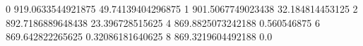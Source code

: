 0 919.0633544921875 49.74139404296875
1 901.5067749023438 32.184814453125
2 892.7186889648438 23.396728515625
4 869.8825073242188 0.560546875
6 869.642822265625 0.32086181640625
8 869.3219604492188 0.0
